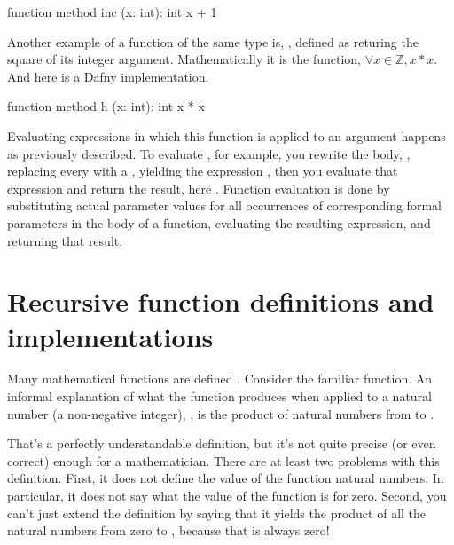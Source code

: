 \documentclass[letterpaper,10pt,english]{sphinxmanual}
\begin{document}
\begin{sphinxVerbatim}[commandchars=\\\{\}]
function method inc (x: int): int \PYGZob{} x + 1 \PYGZcb{}
\end{sphinxVerbatim}

Another example of a function of the same type is, , defined
as returing the square of its integer argument. Mathematically it is
the function, \(\forall x \in {\mathbb Z}, x * x\). And here is
a Dafny implementation.

\begin{sphinxVerbatim}[commandchars=\\\{\}]
function method h (x: int): int \PYGZob{} x * x \PYGZcb{}
\end{sphinxVerbatim}

Evaluating expressions in which this function is applied to an
argument happens as previously described. To evaluate , for
example, you rewrite the body, , replacing every  with a
, yielding the expression , then you evaluate that
expression and return the result, here . Function evaluation is
done by substituting actual parameter values for all occurrences of
corresponding formal parameters in the body of a function, evaluating
the resulting expression, and returning that result.


\section{Recursive function definitions and implementations}
\label{\detokenize{04-runnable-math:recursive-function-definitions-and-implementations}}
Many mathematical functions are defined . Consider the
familiar  function. An informal explanation of what the
function produces when applied to a natural number (a non-negative
integer), , is the product of natural numbers from  to .

That’s a perfectly understandable definition, but it’s not quite
precise (or even correct) enough for a mathematician. There are at
least two problems with this definition. First, it does not define the
value of the function  natural numbers. In particular, it
does not say what the value of the function is for zero. Second, you
can’t just extend the definition by saying that it yields the product
of all the natural numbers from zero to , because that is always
zero!
\end{document}
